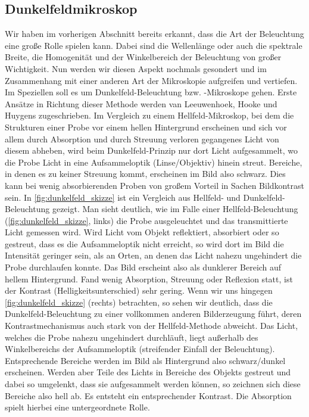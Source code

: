 \documentclass[ngerman]{scrartcl}
\begin{document}
\subsection{Dunkelfeldmikroskop}
\label{subsec:dunkelfeldmikroskop_grundlagen}
Wir haben im vorherigen Abschnitt bereits erkannt, dass die Art der Beleuchtung eine große Rolle spielen kann. Dabei sind die Wellenlänge oder auch die spektrale Breite, die Homogenität und der Winkelbereich der Beleuchtung von großer Wichtigkeit. Nun werden wir diesen Aspekt nochmals gesondert und im Zusammenhang mit einer anderen Art der Mikroskopie aufgreifen und vertiefen. Im Speziellen soll es um Dunkelfeld-Beleuchtung bzw. -Mikroskope gehen. Erste Ansätze in Richtung dieser Methode werden van Leeuwenhoek, Hooke und Huygens zugeschrieben. Im Vergleich zu einem Hellfeld-Mikroskop, bei dem die Strukturen einer Probe vor einem hellen Hintergrund erscheinen und sich vor allem durch Absorption und durch Streuung verloren gegangenes Licht von diesem abheben, wird beim Dunkelfeld-Prinzip nur dort Licht aufgesammelt, wo die Probe Licht in eine Aufsammeloptik (Linse/Objektiv) hinein streut. Bereiche, in denen es zu keiner Streuung kommt, erscheinen im Bild also schwarz. Dies kann bei wenig absorbierenden Proben von großem Vorteil in Sachen Bildkontrast sein. In \autoref{fig:dunkelfeld_skizze} ist ein Vergleich aus Hellfeld- und Dunkelfeld-Beleuchtung gezeigt. Man sieht deutlich, wie im Falle einer Hellfeld-Beleuchtung (\autoref{fig:dunkelfeld_skizze}, links) die Probe ausgeleuchtet und das transmittierte Licht gemessen wird. Wird Licht vom Objekt reflektiert, absorbiert oder so gestreut, dass es die Aufsammeloptik nicht erreicht, so wird dort im Bild die Intensität geringer sein, als an Orten, an denen das Licht nahezu ungehindert die Probe durchlaufen konnte. Das Bild erscheint also als dunklerer Bereich auf hellem Hintergrund. Fand wenig Absorption, Streuung oder Reflexion statt, ist der Kontrast (Helligkeitsunterschied) sehr gering. Wenn wir uns hingegen \autoref{fig:dunkelfeld_skizze} (rechts) betrachten, so sehen wir deutlich, dass die Dunkelfeld-Beleuchtung zu einer vollkommen anderen Bilderzeugung führt, deren Kontrastmechanismus auch stark von der Hellfeld-Methode abweicht. Das Licht, welches die Probe nahezu ungehindert durchläuft, liegt außerhalb des Winkelbereichs der Aufsammeloptik (streifender Einfall der Beleuchtung). Entsprechende Bereiche werden im Bild als Hintergrund also schwarz/dunkel erscheinen. Werden aber Teile des Lichts in Bereiche des Objekts gestreut und dabei so umgelenkt, dass sie aufgesammelt werden können, so zeichnen sich diese Bereiche also hell ab. Es entsteht ein entsprechender Kontrast. Die Absorption spielt hierbei eine untergeordnete Rolle.
\end{document}
